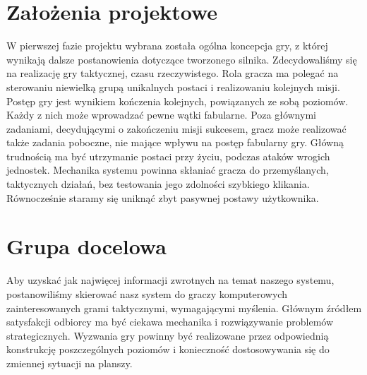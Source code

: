 \documentclass[licencjacka]{pracamgr}
\begin{document}
  \section{Założenia projektowe}
  W pierwszej fazie projektu wybrana została ogólna koncepcja gry, z której wynikają dalsze postanowienia dotyczące 
  tworzonego silnika. Zdecydowaliśmy się na realizację gry taktycznej, czasu rzeczywistego. Rola gracza ma polegać
  na sterowaniu niewielką grupą unikalnych postaci i realizowaniu kolejnych misji. Postęp gry jest wynikiem kończenia 
  kolejnych, powiązanych ze sobą poziomów. Każdy z nich może wprowadzać pewne wątki fabularne. Poza głównymi zadaniami, 
  decydującymi o zakończeniu misji sukcesem, gracz może realizować także zadania poboczne, nie mające wpływu na 
  postęp fabularny gry. Główną trudnością ma być utrzymanie postaci przy życiu, podczas ataków wrogich jednostek.
  Mechanika systemu powinna skłaniać gracza do przemyślanych, taktycznych działań, bez testowania jego zdolności 
  szybkiego klikania. Równocześnie staramy się uniknąć zbyt pasywnej postawy użytkownika. 

  \section{Grupa docelowa}
  Aby uzyskać jak najwięcej informacji zwrotnych na temat naszego systemu, postanowiliśmy skierować nasz system do
  graczy komputerowych zainteresowanych grami taktycznymi, wymagającymi myślenia. Głównym źródłem satysfakcji
  odbiorcy ma być ciekawa mechanika i rozwiązywanie problemów strategicznych. Wyzwania gry powinny być realizowane przez
  odpowiednią konstrukcję poszczególnych poziomów i konieczność dostosowywania się do zmiennej sytuacji na planszy.
\end{document}
